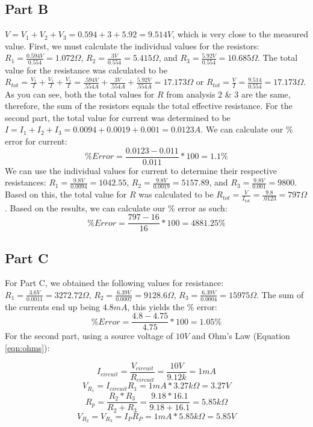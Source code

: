 \documentclass[titlepage]{article}
\begin{document}
\subsection{Part B}\label{sub:part_b-analysis}
$V = V_1 + V_2 + V_3 = 0.594 + 3 + 5.92 = 9.514 V$, which is very close to the measured value. First, we must calculate the individual values for the resistors: $R_1 = \frac{0.594 V}{0.554} = 1.072 \Omega$, $R_2 = \frac{3 V}{0.554} = 5.415 \Omega$, and $R_3 = \frac{5.92 V}{0.554} = 10.685 \Omega$. The total value for the resistance was calculated to be $R_{tot} = \frac{V_1}{I} + \frac{V_1}{I} + \frac{V_1}{I} = \frac{.594 V}{.554 A} + \frac{3 V}{.554 A} + \frac{5.92 V}{.554 A} = 17.173 \Omega$ or $R_{tot} = \frac{V}{I} = \frac{9.514}{0.554} = 17.173 \Omega$. As you can see, both the total values for $R$ from analysis 2 \& 3 are the same, therefore, the sum of the resistors equals the total effective resistance. For the second part, the total value for current was determined to be $I = I_1 + I_2 + I_3 = 0.0094 + 0.0019 + 0.001 = 0.0123 A$. We can calculate our \% error for current:
\[
	\% Error = \frac{0.0123 - 0.011}{0.011} * 100 = 1.1 \%
\]
We can use the individual values for current to determine their respective resistances: $R_1 = \frac{9.8 V}{0.0094} = 1042.55$, $R_2 = \frac{9.8 V}{0.0019} = 5157.89$, and $R_3 = \frac{9.8 V}{0.001} = 9800$. Based on this, the total value for $R$ was calculated to be $R_{tot} = \frac{V}{I_{tot}} = \frac{9.8}{.0123} = 797 \Omega$. Based on the results, we can calculate our \% error as such:
\[
	\% Error = \frac{797 - 16}{16} * 100 = 4881.25 \%
\]

\subsection{Part C}\label{sub:part_c-analysis}
For Part C, we obtained the following values for resistance: $R_1 = \frac{3.6 V}{0.0011} = 3272.72 \Omega$, $R_2 = \frac{6.39 V}{0.0007} = 9128.6 \Omega$, $R_3 = \frac{6.39 V}{0.0004} = 15975 \Omega$. The sum of the currents end up being $4.8 mA$, this yields the \% error:
\[
	\% Error = \frac{4.8 - 4.75}{4.75} * 100 = 1.05 \%
\]
For the second part, using a source voltage of $10 V$ and Ohm's Law (Equation \ref{eqn:ohms}):

\[
	I_{circuit} = \frac{V_{circuit}}{R_{circuit}} = \frac{10 V}{9.12 k} = 1 mA
\]
\[
	V_{R_1} = I_{circuit} R_1 = 1 mA * 3.27 k \Omega = 3.27 V
\]
\[
	R_p = \frac{R_2 * R_3}{R_2 + R_3} = \frac{9.18 * 16.1}{9.18 + 16.1} = 5.85 k \Omega
\]
\[
	V_{R_2} = V_{R_3} = I_P R_P = 1 mA * 5.85 k \Omega = 5.85 V
\]
\end{document}
